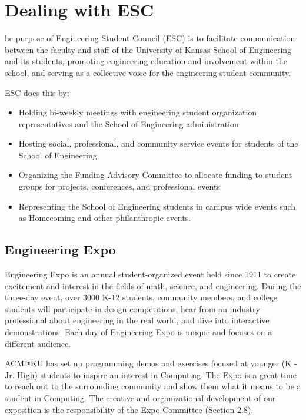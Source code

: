 %
%
\let\textcircled=\pgftextcircled
\chapter{Dealing with ESC}
\label{chap:esc}

he purpose of Engineering Student Council (ESC) is to facilitate communication between the faculty and staff of the University of Kansas School of Engineering and its students, promoting engineering education and involvement within the school, and serving as a collective voice for the engineering student community.

ESC does this by:
\begin{itemize}
	\item Holding bi-weekly meetings with engineering student organization representatives and the School of Engineering administration
	\item Hosting social, professional, and community service events for students of the School of Engineering
	\item Organizing the Funding Advisory Committee to allocate funding to student groups for projects, conferences, and professional events
	\item Representing the School of Engineering students in campus wide events such as Homecoming and other philanthropic events.
\end{itemize}


\section{Engineering Expo}
\label{sec:sec01}

Engineering Expo is an annual student-organized event held since 1911 to create excitement and interest in the fields of math, science, and engineering. During the three-day event, over 3000 K-12 students, community members, and college students will participate in design competitions, hear from an industry professional about engineering in the real world, and dive into interactive demonstrations.  Each day of Engineering Expo is unique and focuses on a different audience.

ACM@KU has set up programming demos and exercises focused at younger (K - Jr. High) students to inspire an interest in Computing. The Expo is a great time to reach out to the surrounding community and show them what it means to be a student in Computing. The creative and organizational development of our exposition is the responsibility of the Expo Committee (\hyperref[sec:committees]{Section 2.8}).

